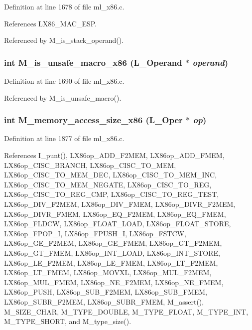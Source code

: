 Definition at line 1678 of file ml\_\-x86.c.

References LX86\_\-MAC\_\-ESP.

Referenced by M\_\-is\_\-stack\_\-operand().
\subsubsection{\setlength{\rightskip}{0pt plus 5cm}int M\_\-is\_\-unsafe\_\-macro\_\-x86 (L\_\-Operand $\ast$ {\em operand})}\label{ml__x86_8c_9815a77f31bd8e5ee3ecaa306475f253}




Definition at line 1690 of file ml\_\-x86.c.

Referenced by M\_\-is\_\-unsafe\_\-macro().
\subsubsection{\setlength{\rightskip}{0pt plus 5cm}int M\_\-memory\_\-access\_\-size\_\-x86 (L\_\-Oper $\ast$ {\em op})}\label{ml__x86_8c_cf2c95365ea5d4189a6c38b338142be9}




Definition at line 1877 of file ml\_\-x86.c.

References I\_\-punt(), LX86op\_\-ADD\_\-F2MEM, LX86op\_\-ADD\_\-FMEM, LX86op\_\-CISC\_\-BRANCH, LX86op\_\-CISC\_\-TO\_\-MEM, LX86op\_\-CISC\_\-TO\_\-MEM\_\-DEC, LX86op\_\-CISC\_\-TO\_\-MEM\_\-INC, LX86op\_\-CISC\_\-TO\_\-MEM\_\-NEGATE, LX86op\_\-CISC\_\-TO\_\-REG, LX86op\_\-CISC\_\-TO\_\-REG\_\-CMP, LX86op\_\-CISC\_\-TO\_\-REG\_\-TEST, LX86op\_\-DIV\_\-F2MEM, LX86op\_\-DIV\_\-FMEM, LX86op\_\-DIVR\_\-F2MEM, LX86op\_\-DIVR\_\-FMEM, LX86op\_\-EQ\_\-F2MEM, LX86op\_\-EQ\_\-FMEM, LX86op\_\-FLDCW, LX86op\_\-FLOAT\_\-LOAD, LX86op\_\-FLOAT\_\-STORE, LX86op\_\-FPOP\_\-I, LX86op\_\-FPUSH\_\-I, LX86op\_\-FSTCW, LX86op\_\-GE\_\-F2MEM, LX86op\_\-GE\_\-FMEM, LX86op\_\-GT\_\-F2MEM, LX86op\_\-GT\_\-FMEM, LX86op\_\-INT\_\-LOAD, LX86op\_\-INT\_\-STORE, LX86op\_\-LE\_\-F2MEM, LX86op\_\-LE\_\-FMEM, LX86op\_\-LT\_\-F2MEM, LX86op\_\-LT\_\-FMEM, LX86op\_\-MOVXL, LX86op\_\-MUL\_\-F2MEM, LX86op\_\-MUL\_\-FMEM, LX86op\_\-NE\_\-F2MEM, LX86op\_\-NE\_\-FMEM, LX86op\_\-PUSH, LX86op\_\-SUB\_\-F2MEM, LX86op\_\-SUB\_\-FMEM, LX86op\_\-SUBR\_\-F2MEM, LX86op\_\-SUBR\_\-FMEM, M\_\-assert(), M\_\-SIZE\_\-CHAR, M\_\-TYPE\_\-DOUBLE, M\_\-TYPE\_\-FLOAT, M\_\-TYPE\_\-INT, M\_\-TYPE\_\-SHORT, and M\_\-type\_\-size().

